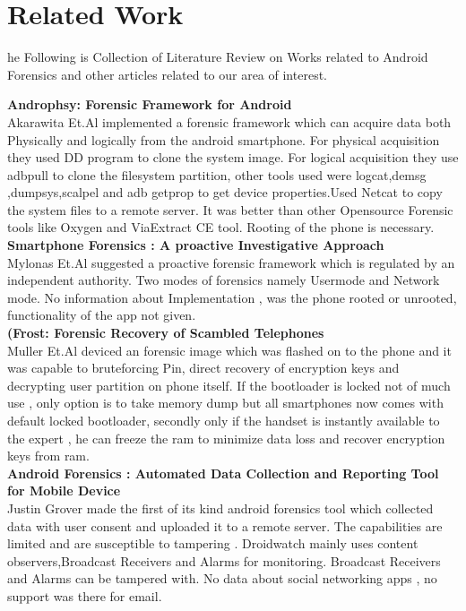\let\textcircled=\pgftextcircled
\chapter{Related Work}
\label{chap:lit_review}
he Following is Collection of Literature Review on Works related to Android Forensics and other articles related to our area of interest.\\
\bigskip 

\textbf{Androphsy: Forensic Framework for Android }\\
Akarawita Et.Al \cite{akarawita_2015} implemented a forensic framework which can acquire data both 
Physically and logically from the android smartphone. For physical acquisition they 
used DD program to clone the system image. For logical acquisition they use adbpull 
to clone the filesystem partition, other tools used were logcat,demsg ,dumpsys,scalpel 
and adb getprop to get device properties.Used Netcat to copy the system files to a 
remote server. It was better than other Opensource Forensic tools like Oxygen and 
ViaExtract CE tool. Rooting of the phone is necessary.\\

\textbf{Smartphone Forensics : A proactive Investigative Approach}\\
Mylonas Et.Al  suggested a proactive forensic framework which is regulated by an 
independent authority. Two modes of forensics namely Usermode and Network 
mode. No information about Implementation , was the phone rooted or unrooted, 
functionality of the app not given.\\ 

\textbf{(Frost: Forensic Recovery of Scambled Telephones}\\
Muller Et.Al\cite{muller2013frost} deviced an forensic image which was flashed on to the phone and it was 
capable to bruteforcing Pin, direct recovery of encryption keys and decrypting user 
partition on phone itself. If the bootloader is locked not of much use , only option is 
to take memory dump but all smartphones now comes with default locked bootloader, secondly only if the handset is instantly available to the expert , he can freeze the ram to minimize 
data loss and recover encryption keys from ram.\\

\textbf{Android Forensics : Automated Data Collection and Reporting Tool for Mobile Device }\\
Justin Grover \cite{Grovera2013} made the first of its kind android forensics tool which collected data with user consent and uploaded it to a remote server. The capabilities are limited and are susceptible to tampering . Droidwatch mainly uses content observers,Broadcast Receivers and Alarms for monitoring. Broadcast Receivers and Alarms can be tampered with. No data about social networking apps , no support was there for email. \\


